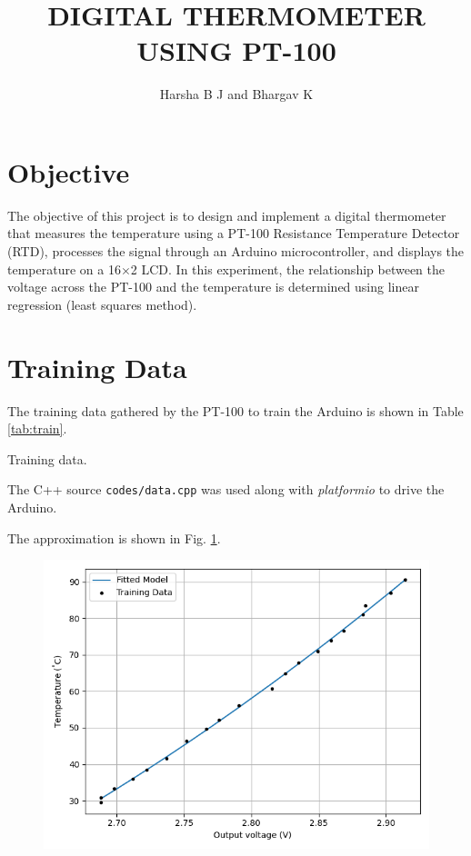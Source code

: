 \documentclass[journal,12pt,onecolumn]{IEEEtran}
\begin{document}
\vspace{3cm}
\title{DIGITAL THERMOMETER USING PT-100}
\author{Harsha B J and Bhargav K}
\maketitle

\newpage
\tableofcontents

\newpage
\bigskip

\section{\textbf{Objective}}
The objective of this project is to design and implement a digital thermometer that measures the temperature using a PT-100 Resistance Temperature Detector (RTD), processes the signal through an Arduino microcontroller, and displays the temperature on a 16$\times$2 LCD. In this experiment, the relationship between the voltage across
the PT-100 and the temperature is determined using linear regression (least squares
method).

\section{\textbf{Training Data}}
The training data gathered by the PT-100 to train the Arduino is shown in Table
\ref{tab:train}.

\begin{table}[H]
    \centering
    
    \caption{Training data.}
    \label{tab:train}
\end{table}

The C++ source \texttt{codes/data.cpp} was used along with \textit{platformio} to drive the Arduino.

The approximation is shown in Fig. \ref{fig:train}.
\begin{figure}[H]
    \centering
    \includegraphics[width=0.6\columnwidth]{figs/temp_vs_voltage/train.png}
    \label{fig:train}
\end{figure}
\end{document}
